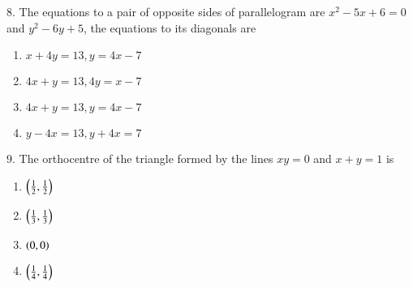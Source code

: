 \documentclass[journal,12pt,twocolumn]{IEEEtran}
\theoremstyle{remark}
\begin{document}
$8$. The equations to a pair of opposite sides of parallelogram are $x^{2}-5x+6=0$ and $y^{2}-6y+5$, the equations to its diagonals are \hfill{}
\begin{enumerate}[label=(\alph*)]
    \item $x+4y=13,y=4x-7$
    \item $4x+y=13,4y=x-7$
    \item $4x+y=13,y=4x-7$
    \item $y-4x=13,y+4x=7$
\end{enumerate}
$9$. The orthocentre of the triangle formed by the lines $xy=0$ and $x+y=1$ is \hfill{}
\begin{enumerate}[label=(\alph*)]
    \item $\left(\frac{1}{2},\frac{1}{2}\right)$
    \item $\left(\frac{1}{3},\frac{1}{3}\right)$
    \item $\left(0,0\right)$
    \item $\left(\frac{1}{4},\frac{1}{4}\right)$
\end{enumerate}
\end{document}
